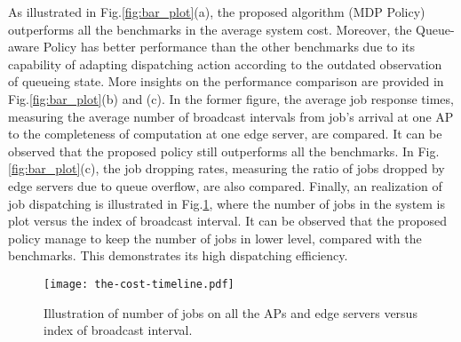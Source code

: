 As illustrated in Fig.\ref{fig:bar_plot}(a), the proposed algorithm (MDP Policy) outperforms all the benchmarks in the average system cost.
Moreover, the Queue-aware Policy has better performance than the other benchmarks due to its capability of adapting dispatching action according to the outdated observation of queueing state.
More insights on the performance comparison are provided in Fig.\ref{fig:bar_plot}(b) and (c).
In the former figure, the average job response times, measuring the average number of broadcast intervals from job's arrival at one AP to the completeness of computation at one edge server, are compared.
It can be observed that the proposed policy still outperforms all the benchmarks.
In Fig.\ref{fig:bar_plot}(c), the job dropping rates, measuring the ratio of jobs dropped by edge servers due to queue overflow, are also compared.
Finally, an realization of job dispatching is illustrated in Fig.\ref{fig:general_timeline}, where the number of jobs in the system is plot versus the index of broadcast interval.
It can be observed that the proposed policy manage to keep the number of jobs in lower level, compared with the benchmarks.
This demonstrates its high dispatching efficiency.

\begin{figure}[ht!]                                                                             %
    \centering                                                                                  %
    \texttt{[image: the-cost-timeline.pdf]}                     %
    \caption{Illustration of number of jobs on all the APs and edge servers versus index of broadcast interval.}
    \label{fig:general_timeline}                                                                %
\end{figure}                                                                                    %

